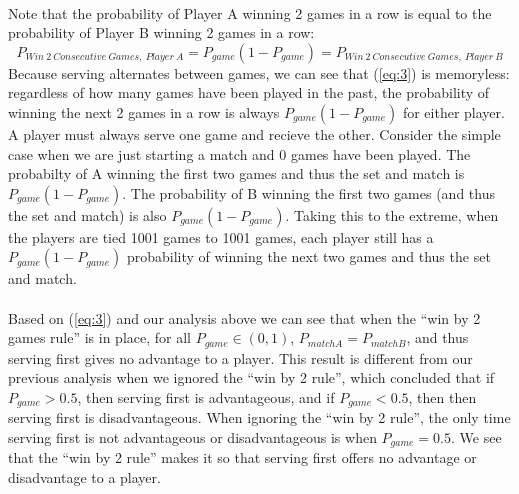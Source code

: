 \documentclass[12pt]{article}
\begin{document}
\paragraph{} Note that the probability of Player A winning 2 games in a row is equal to the probability of Player B winning 2 games in a row:
\begin{equation}
P_{Win\ 2\ Consecutive\ Games,\ Player\ A}=P_{game}(1-P_{game})=P_{Win\ 2\ Consecutive\ Games,\ Player\ B}
\label{eq:3}
\end{equation}
Because serving alternates between games, we can see that (\ref{eq:3}) is memoryless: regardless of how many games have been played in the past, the probability of winning the next 2 games in a row is always $P_{game}(1-P_{game})$ for either player. A player must always serve one game and recieve the other. Consider the simple case when we are just starting a match and 0 games have been played. The probabilty of A winning the first two games and thus the set and match is $P_{game}(1-P_{game})$. The probability of B winning the first two games (and thus the set and match) is also $P_{game}(1-P_{game})$. Taking this to the extreme, when the players are tied 1001 games to 1001 games, each player still has a $P_{game}(1-P_{game})$ probability of winning the next two games and thus the set and match.
 
\paragraph{} Based on (\ref{eq:3}) and our analysis above we can see that when the ``win by 2 games rule'' is in place, for all $P_{game} \in (0,1)$, $P_{matchA}=P_{matchB}$, and thus serving first gives no advantage to a player. This result is different from our previous analysis when we ignored the ``win by 2 rule'', which concluded that if $P_{game}>0.5$, then serving first is advantageous, and if $P_{game}<0.5$, then then serving first is disadvantageous. When ignoring the ``win by 2 rule'', the only time serving first is not advantageous or disadvantageous is when $P_{game}=0.5$. We see that the ``win by 2 rule'' makes it so that serving first offers no advantage or disadvantage to a player.
\end{document}
